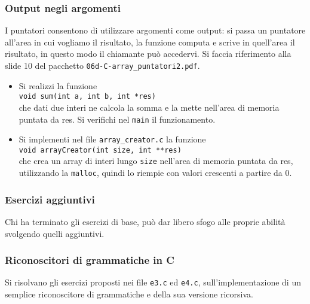 \documentclass{beamer}
\begin{document}
\begin{frame}
\frametitle{Output negli argomenti}
I puntatori consentono di utilizzare argomenti come output: si passa un puntatore all'area in cui vogliamo il risultato, la funzione computa e scrive in quell'area il risultato, in questo modo il chiamante può accedervi. Si faccia riferimento alla slide 10 del pacchetto \texttt{06d-C-array\_puntatori2.pdf}.
\begin{itemize}
 \item Si realizzi la funzione\\ \texttt{void sum(int a, int b, int *res)} \\che dati due interi ne calcola la somma e la mette nell'area di memoria puntata da res. Si verifichi nel \texttt{main} il funzionamento.
 \item Si implementi nel file \texttt{array\_creator.c} la funzione\\ \texttt{void arrayCreator(int size, int **res)} \\che crea un array di interi lungo \texttt{size} nell'area di memoria puntata da res, utilizzando la \texttt{malloc}, quindi lo riempie con valori crescenti a partire da 0.
\end{itemize}
\end{frame}

\begin{frame}
\frametitle{Esercizi aggiuntivi}
Chi ha terminato gli esercizi di base, può dar libero sfogo alle proprie abilità svolgendo quelli aggiuntivi.
\end{frame}

\begin{frame}
\frametitle{Riconoscitori di grammatiche in C}
Si risolvano gli esercizi proposti nei file \texttt{e3.c} ed \texttt{e4.c}, sull'implementazione di un semplice riconoscitore di grammatiche e della sua versione ricorsiva.
\end{frame}
\end{document}
